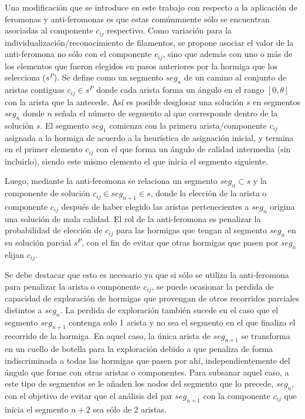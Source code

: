 Una modificaci\'on que se introduce en este trabajo con respecto a la aplicaci\'on de  feromonas y anti-feromonas es que estas com\'unmnente s\'olo se encuentran asociadas al componente $c_{ij}$ respectivo. Como variaci\'on para la individualizaci\'on/reconocimiento de filamentos, se propone asociar el valor de la anti-feromona no s\'olo con el componente $c_{ij}$, sino que adem\'as con uno o m\'as de los elementos que fueron elegidos en pasos anteriores por la hormiga que los selecciona ($s^{P}$). Se define como un segmento $seg_n$ de un camino al conjunto de aristas contiguas $c_{ij} \in s^{P}$ donde cada arista forma un \'angulo en el rango $[0, \theta]$ con la arista que la antecede. As\'i es posible desglosar una soluci\'on $s$ en segmentos $seg_{n}$ donde $n$ se\~nala el n\'umero de segmento al que corresponde dentro de la soluci\'on $s$. El segmento $seg_1$ comienza con la primera arista/componente $c_{ij}$ asignada a la hormiga de acuerdo a la heur\'istica de asignaci\'on inicial, y termina en el primer elemento $c_{ij}$ con el que forma un \'angulo de calidad intermedia (sin incluirlo), siendo este mismo elemento el que inicia el segmento siguiente.


Luego, mediante la anti-feromona se relaciona un segmento $seg_n \subset s$ y la componente de soluci\'on $c_{ij} \in seg_{n+1} \in s$, donde la elecci\'on de la arista o componente $c_{ij}$ despu\'es de haber elegido las aristas pertenecientes a $seg_n$ origina una soluci\'on de mala calidad. El rol de la anti-feromona es penalizar la probabilidad de elecci\'on de $c_{ij}$ para las hormigas que tengan al segmento $seg_n$ en su soluci\'on parcial $s^{P}$, con el fin de evitar que otras hormigas que pasen por $seg_n$ elijan $c_{ij}$.


Se debe destacar que esto es necesario ya que si s\'olo se utiliza la anti-feromona para penalizar la arista o componente $c_{ij}$, se puede ocasionar la perdida de capacidad de exploraci\'on de hormigas que provengan de otros recorridos parciales distintos a $seg_n$. La perdida de exploraci\'on tambi\'en sucede en el caso que el segmento $seg_{n+1}$ contenga solo 1 arista y no sea el segmento en el que finaliza el recorrido de la hormiga. En aquel caso, la \'unica arista de $seg_{n+1}$ se transforma en un cuello de botella para la exploraci\'on debido a que penaliza de forma indiscriminada a todas las hormigas que pasen por ah\'i, independientemente del \'angulo que forme con otras aristas o componentes. Para subsanar aquel caso, a este tipo de segmentos se le a\~naden los nodos del segmento que lo precede, $seg_{n}$, con el objetivo de evitar que el an\'alisis del par $seg_{n+1}$ con la componente $c_{ij}$ que inicia el segmento $n+2$ sea s\'olo de 2 aristas.


